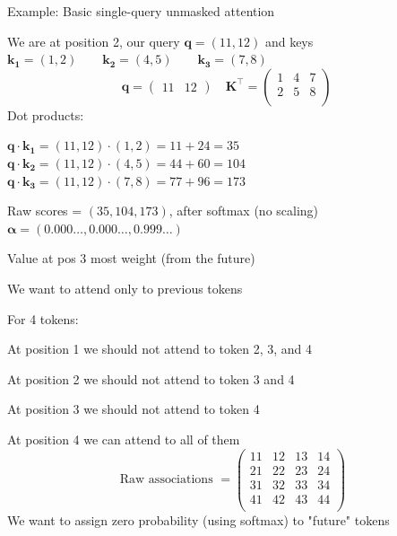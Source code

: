 \documentclass[12pt,aspectratio=169,handout]{beamer}
\begin{document}
\begin{frame}{Example: Basic single-query unmasked attention}

We are at position 2, our query $\bm{q} = (11, 12)$ and keys
$\bm{k_1} = (1, 2) \qquad \bm{k_2} = (4, 5) \qquad \bm{k_3} = (7, 8)$
$$
\bm{q} = \begin{pmatrix}
	11 & 12
\end{pmatrix}
\quad
\bm{K}^\top =
\begin{pmatrix}
1 & 4 & 7 \\
2 & 5 & 8 \\
\end{pmatrix}
\quad
$$
Dot products:

$\bm{q} \cdot \bm{k_1} = (11, 12) \cdot (1, 2) = 11 + 24 = 35$
$\bm{q} \cdot \bm{k_2} = (11, 12) \cdot (4, 5) = 44 + 60 = 104$
$\bm{q} \cdot \bm{k_3} = (11, 12) \cdot (7, 8) = 77 + 96 = 173$

Raw scores = $(35, 104, 173)$, after softmax (no scaling) $\bm{\alpha} = (0.000\ldots, 0.000\ldots, 0.999\ldots)$

Value at pos 3 most weight (from the future)



\end{frame}


\begin{frame}{We want to attend only to previous tokens}
	
For 4 tokens:

At position 1 we should not attend to token 2, 3, and 4

At position 2 we should not attend to token 3 and 4

At position 3 we should not attend to token 4

At position 4 we can attend to all of them
$$
\text{Raw associations } =
\begin{pmatrix}
11 & 12 & 13 & 14 \\
21 & 22 & 23 & 24 \\
31 & 32 & 33 & 34 \\
41 & 42 & 43 & 44 \\
\end{pmatrix}
$$
We want to assign zero probability (using softmax) to "future" tokens
\end{frame}
\end{document}
